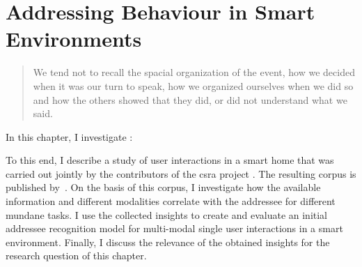 \chapter{Addressing Behaviour in Smart Environments}\label{ch.address}


\blockcquote[p. 1]{kendon1990}{We tend not to recall the spacial organization of the event, how we decided when it was our \gls{turn} to speak, how we organized ourselves when we did so and how the others showed that they did, or did not understand what we said.\\}

In this chapter, I investigate :
\blockquote{\hypaddress}.
To this end, I describe a study of \naive{} user interactions in a \gls{smart home} that was carried out jointly by the contributors of the \gls{csra} project \cite{Bernotat2016}.
The resulting corpus is published by~.
On the basis of this corpus, I investigate how the available information and different modalities correlate with the \gls{addressee} for different mundane tasks.
I use the collected insights to create and evaluate an initial \gls{addressee} recognition model for multi-modal single user interactions in a \gls{smart environment}.
Finally, I discuss the relevance of the obtained insights for the research question of this chapter.

